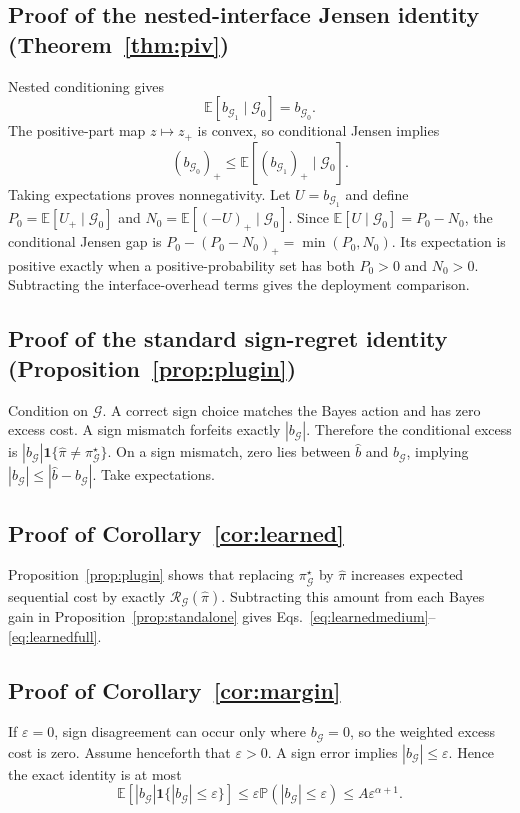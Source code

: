 \documentclass[10pt]{article}
\theoremstyle{definition}
\theoremstyle{remark}
\newcommand{\E}{\mathbb{E}}
\newcommand{\Prb}{\mathbb{P}}
\newcommand{\G}{\mathcal{G}}
\newcommand{\pos}[1]{\left(#1\right)_{+}}
\begin{document}
\subsection{Proof of the nested-interface Jensen identity (Theorem~\ref{thm:piv})}
Nested conditioning gives
\[
 \E[b_{\G_1}\mid\G_0]=b_{\G_0}.
\]
The positive-part map $z\mapsto z_+$ is convex, so conditional Jensen implies
\[
 \pos{b_{\G_0}}
 \leq \E[\pos{b_{\G_1}}\mid\G_0].
\]
Taking expectations proves nonnegativity.  Let $U=b_{\G_1}$ and define
$P_0=\E[U_+\mid\G_0]$ and $N_0=\E[(-U)_+\mid\G_0]$.  Since
$\E[U\mid\G_0]=P_0-N_0$, the conditional Jensen gap is
$P_0-(P_0-N_0)_+=\min(P_0,N_0)$.  Its expectation is positive exactly when a
positive-probability set has both $P_0>0$ and $N_0>0$.  Subtracting the
interface-overhead terms gives the deployment comparison.

\subsection{Proof of the standard sign-regret identity (Proposition~\ref{prop:plugin})}
Condition on $\G$.  A correct sign choice matches the Bayes action and has
zero excess cost.  A sign mismatch forfeits exactly $|b_{\G}|$.  Therefore the
conditional excess is
$|b_{\G}|\mathbf{1}\{\widehat\pi\neq\pi^\star_{\G}\}$.
On a sign mismatch, zero lies between $\widehat b$ and $b_{\G}$, implying
$|b_{\G}|\leq|\widehat b-b_{\G}|$.  Take expectations.

\subsection{Proof of Corollary~\ref{cor:learned}}
Proposition~\ref{prop:plugin} shows that replacing
$\pi^\star_{\G}$ by $\widehat\pi$ increases expected sequential cost by
exactly $\mathcal R_{\G}(\widehat\pi)$.  Subtracting this amount from each
Bayes gain in Proposition~\ref{prop:standalone} gives
Eqs.~\eqref{eq:learnedmedium}--\eqref{eq:learnedfull}.

\subsection{Proof of Corollary~\ref{cor:margin}}
If $\varepsilon=0$, sign disagreement can occur only where $b_{\G}=0$, so the
weighted excess cost is zero.  Assume henceforth that $\varepsilon>0$.
A sign error implies $|b_{\G}|\le\varepsilon$.  Hence the exact identity is at
most
\[
\E\!\left[|b_{\G}|\mathbf 1\{|b_{\G}|\le\varepsilon\}\right]
\le \varepsilon\Prb(|b_{\G}|\le\varepsilon)
\le A\varepsilon^{\alpha+1}.
\]
\end{document}
